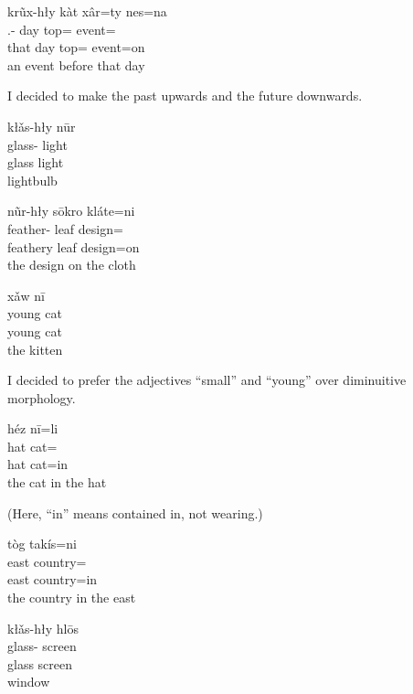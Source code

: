 \begin{exe}
    \ex
    \glll
    krũx-hły kàt xâr=ty nes=na \\
    \Dem{}.\Dist{}-\Adj{} day top=\Poss{} event=\AdessTwo{} \\
    that day top=\Poss{} event=on \\
    \glt
    an event before that day
\end{exe}
I decided to make the past upwards and the future downwards.

\begin{exe}
    \ex
    \glll
    kłǎs-hły nūr \\
    glass-\Adj{} light \\
    glass light \\
    \glt
    lightbulb
\end{exe}

\begin{exe}
    \ex
    \glll
    nũr-hły sōkro kláte=ni \\
    feather-\Adj{} leaf design=\InessTwo{} \\
    feathery leaf design=on \\
    \glt
    the design on the cloth
\end{exe}

\begin{exe}
    \ex
    \glll
    xǎw nī \\
    young cat \\
    young cat \\
    \glt
    the kitten
\end{exe}
I decided to prefer the adjectives ``small'' and ``young'' over diminuitive morphology.

\begin{exe}
    \ex
    \glll
    héz nī=li \\
    hat cat=\InessThree{} \\
    hat cat=in \\
    \glt
    the cat in the hat
\end{exe}
(Here, ``in'' means contained in, not wearing.)

\begin{exe}
    \ex
    \glll
    tòg takís=ni \\
    east country=\InessTwo{} \\
    east country=in \\
    \glt
    the country in the east
\end{exe}

\begin{exe}
    \ex
    \glll
    kłǎs-hły hlōs \\
    glass-\Adj{} screen \\
    glass screen \\
    \glt
    window
\end{exe}

